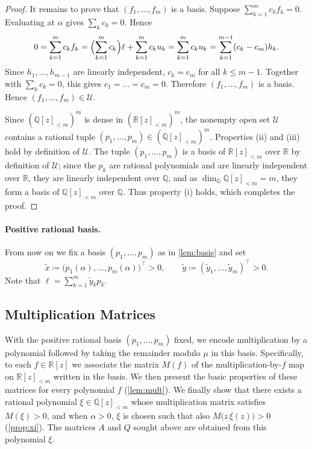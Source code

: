 \documentclass[11pt, a4paper]{article}
\theoremstyle{plain}
\theoremstyle{definition}
\newcommand{\Q}{\mathbb{Q}}
\newcommand{\R}{\mathbb{R}}
\newcommand{\PP}{\R[z]_{<m}}
\newcommand{\PQ}{\Q[z]_{<m}}
\newcommand{\defas}{\coloneqq}
\begin{document}
\begin{proof}
It remains to prove that $(f_1,\dots,f_m)$ is a basis. Suppose
$\sum_{k=1}^mc_kf_k=0$. Evaluating at $\alpha$ gives $\sum_kc_k=0$. Hence
\[
0=\sum_{k=1}^mc_kf_k
=\Bigl(\sum_{k=1}^mc_k\Bigr)\ell+\sum_{k=1}^mc_ku_k
=\sum_{k=1}^mc_ku_k
=\sum_{k=1}^{m-1}(c_k-c_m)h_k .
\]
Since $h_1,\dots,h_{m-1}$ are linearly independent, $c_k=c_m$ for all
$k\leq m-1$. Together with $\sum_kc_k=0$, this gives $c_1=\dots=c_m=0$.
Therefore $(f_1,\dots,f_m)$ is a basis.
Hence $(f_1,\dots,f_m)\in\mathcal U$.

Since $(\PQ)^m$ is dense in $(\PP)^m$, the nonempty open set $\mathcal U$ contains a rational tuple $(p_1,\dots,p_m)\in(\PQ)^m$. Properties (ii) and (iii) hold by definition of $\mathcal U$. The tuple $(p_1,\dots,p_m)$ is a basis of $\PP$ over $\R$ by definition of $\mathcal U$; since the $p_k$ are rational polynomials and are linearly independent over $\R$, they are linearly independent over $\Q$, and as $\dim_\Q\PQ=m$, they form a basis of $\PQ$ over $\Q$. Thus property (i) holds, which completes the proof.
\end{proof}

\paragraph{Positive rational basis.}
From now on we fix a basis $(p_1,\dots,p_m)$ as in \cref{lem:basis} and set
\begin{equation}\label{eq:pie}
\tilde x\defas \bigl(p_1(\alpha),\dots,p_m(\alpha)\bigr)^{\top}>0,
\qquad
\tilde y\defas (\tilde y_1,\dots,\tilde y_m)^{\top}>0 .
\end{equation}
Note that $\ell=\sum_{k=1}^m\tilde y_kp_k$.


\subsection{Multiplication Matrices}

With the positive rational basis $(p_1,\dots,p_m)$ fixed, we encode multiplication by a polynomial followed by taking the remainder modulo $\mu$ in this basis.
Specifically, to each $f\in\R[z]$ we associate the matrix $M(f)$ of the multiplication-by-$f$ map on $\PP$ written in the basis.
We then present the basic properties of these matrices for every polynomial $f$ (\cref{lem:mult}).
We finally show that there exists a rational polynomial $\xi \in \PQ$ whose multiplication matrix satisfies $M(\xi)>0$, and when $\alpha>0$, $\xi$ is chosen such that also $M\bigl(z\,\xi(z)\bigr)>0$ (\cref{prop:xi}).
The matrices $A$ and $Q$ sought above are obtained from this polynomial $\xi$.
\end{document}
